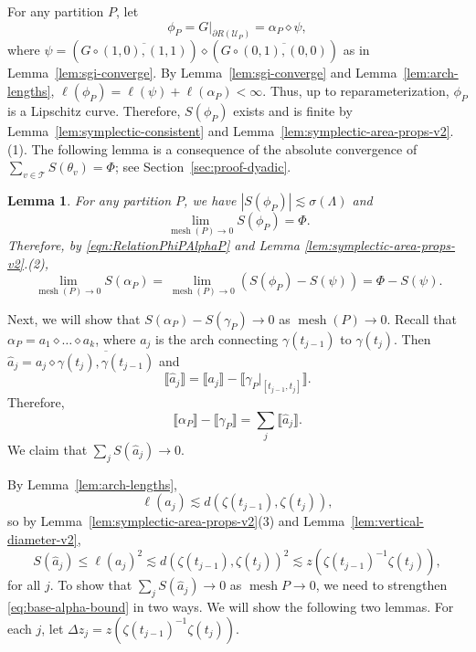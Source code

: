 \documentclass[12pt,reqno]{amsart}
\newcommand{\fcl}[1]{\llbracket{#1}\rrbracket}
\newcommand{\cT}{\mathcal{T}}
\newcommand{\cU}{\mathcal{U}}
\DeclareMathOperator{\mesh}{mesh}
\newtheorem{lemma}[thm]{Lemma}
\theoremstyle{remark}
\newcommand{\0}{\mathbf{0}}
\renewcommand{\1}{\mathbf 1}
\begin{document}
For any partition $P$, let
\begin{equation}\label{eqn:RelationPhiPAlphaP}
\phi_P = G|_{\partial R(\cU_P)} = \alpha_P \diamond \psi,
\end{equation}
where $\psi = (G\circ \overline{(1,0),(1,1)}) \diamond (G\circ \overline{(0,1),(0,0)})$ as in Lemma~\ref{lem:sgi-converge}.
By Lemma~\ref{lem:sgi-converge} and Lemma~\ref{lem:arch-lengths}, $\ell(\phi_P) = \ell(\psi) + \ell(\alpha_P) < \infty$. Thus, up to reparameterization, $\phi_P$ is a Lipschitz curve. Therefore, $S(\phi_P)$ exists and is finite by Lemma~\ref{lem:symplectic-consistent} and Lemma~\ref{lem:symplectic-area-props-v2}.(1). The following lemma is a consequence of the absolute convergence of $\sum_{v\in \cT} S(\theta_v)=\Phi$; see Section~\ref{sec:proof-dyadic}. 
\begin{lemma}\label{lem:lim-dyadic}
  For any partition $P$, we have $|S(\phi_P)| \lesssim \sigma(\Lambda)$ and
  \begin{equation}\label{eq:lim-dyadic}
    \lim_{\mesh(P)\to 0} S(\phi_P) = \Phi.
  \end{equation}
  Therefore, by \eqref{eqn:RelationPhiPAlphaP} and Lemma \ref{lem:symplectic-area-props-v2}.(2),
  $$\lim_{\mesh(P)\to 0} S(\alpha_P) = \lim_{\mesh(P)\to 0} (S(\phi_P) - S(\psi)) = \Phi - S(\psi).$$
\end{lemma}
Next, we will show that $S(\alpha_P) - S(\gamma_P) \to 0$ as $\mesh(P)\to 0$. Recall that $\alpha_P = a_1\diamond \dots \diamond a_k$, where $a_j$ is the arch connecting $\gamma(t_{j-1})$ to $\gamma(t_j)$. Then $\hat{a}_j = a_j \diamond \overline{\gamma(t_j), \gamma(t_{j-1})}$ and
$$\fcl{\hat{a}_j} = \fcl{a_j} - \fcl{\gamma_P|_{[t_{j-1},t_j]}}.$$
Therefore,
\begin{equation}\label{eq:alpha-P-gamma-P}
\fcl{\alpha_P} - \fcl{\gamma_P} = \sum_j \fcl{\hat{a}_j}.
\end{equation}
We claim that $\sum_j S(\hat{a}_j) \to 0$.

By Lemma~\ref{lem:arch-lengths}, 
$$\ell(a_j) \lesssim d(\zeta(t_{j-1}),\zeta(t_j)),$$ so by Lemma~\ref{lem:symplectic-area-props-v2}(3) and Lemma~\ref{lem:vertical-diameter-v2},
\begin{equation}\label{eq:base-alpha-bound}
  S(\hat{a}_j) \leq \ell(a_j)^2 \lesssim d(\zeta(t_{j-1}),\zeta(t_j))^2 \lesssim z(\zeta(t_{j-1})^{-1} \zeta(t_j)),
\end{equation}
for all $j$. To show that $\sum_j S(\hat{a}_j) \to 0$ as $\mesh P\to 0$, we need to strengthen \eqref{eq:base-alpha-bound} in two ways. We will show the following two lemmas. For each $j$, let $\Delta z_j = z(\zeta(t_{j-1})^{-1} \zeta(t_j))$.
\end{document}
